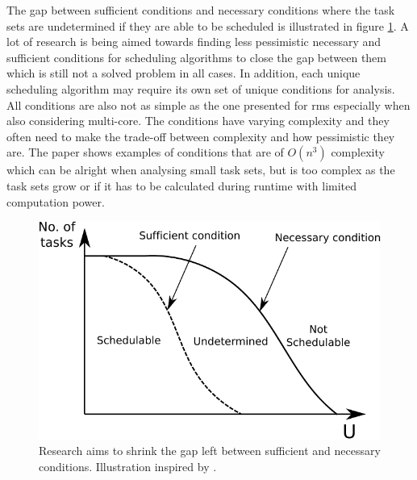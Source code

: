 \documentclass{kththesis}
\begin{document}
The gap between sufficient conditions and necessary conditions where the task sets are undetermined
if they are able to be scheduled is illustrated in figure
\ref{fig:sufficient_necessary_schedulability}. A lot of research is being aimed towards finding less
pessimistic necessary and sufficient conditions for scheduling algorithms to close the gap between
them which is still not a solved problem in all cases. In addition, each unique scheduling algorithm
may require its own set of unique conditions for analysis. All conditions are also not as simple as
the one presented for \acrshort{rms} especially when also considering multi-core. The conditions
have varying complexity and they often need to make the trade-off between complexity and how
pessimistic they are. The paper \parencite{bertogna_tests_2011} shows examples of conditions that
are of $ O(n^3) $ complexity which can be alright when analysing small task sets, but is too complex
as the task sets grow or if it has to be calculated during runtime with limited computation power.

\begin{figure}

    \centering

    \includegraphics[width=0.8\linewidth]{images/sufficient_necessary_schedulability.pdf}

    \caption{Research aims to shrink the gap left between sufficient and necessary conditions.
    Illustration inspired by \parencite{sebestyen_simulation-based_2012}.}

    \label{fig:sufficient_necessary_schedulability}

\end{figure}
\end{document}
